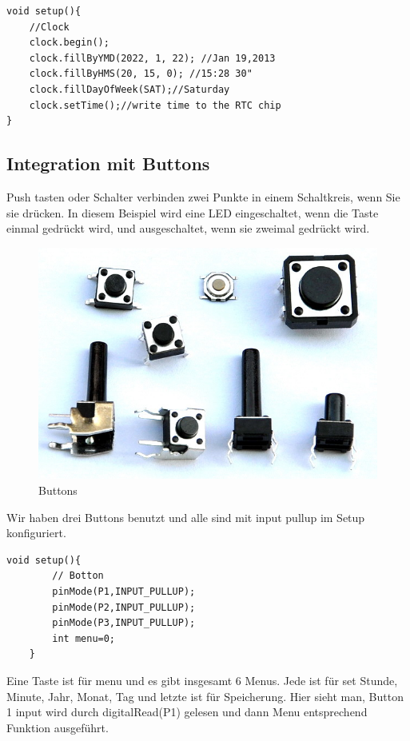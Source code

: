 \documentclass[conference]{IEEEtran}
\begin{document}
\begin{lstlisting}[style=CStyle]
void setup(){
	//Clock
	clock.begin();
	clock.fillByYMD(2022, 1, 22); //Jan 19,2013
	clock.fillByHMS(20, 15, 0); //15:28 30"
	clock.fillDayOfWeek(SAT);//Saturday
	clock.setTime();//write time to the RTC chip
}
\end{lstlisting}\textbf{}

\subsection{Integration mit Buttons}
Push tasten oder Schalter verbinden zwei Punkte in einem Schaltkreis, wenn Sie sie drücken. In diesem Beispiel wird eine LED eingeschaltet, wenn die Taste einmal gedrückt wird, und ausgeschaltet, wenn sie zweimal gedrückt wird.

\begin{figure}
	\begin{center}
		\includegraphics[scale=0.25]{btn}
	\end{center}
	\caption{Buttons}
\end{figure}

Wir haben drei Buttons benutzt und alle sind mit input pullup im Setup konfiguriert. 

\begin{lstlisting}[style=CStyle]
	void setup(){
		// Botton
		pinMode(P1,INPUT_PULLUP);
		pinMode(P2,INPUT_PULLUP);
		pinMode(P3,INPUT_PULLUP);
		int menu=0;
	}
\end{lstlisting}\textbf{}

Eine Taste ist für menu und es gibt insgesamt 6 Menus. Jede ist für set Stunde, Minute, Jahr, Monat,  Tag und letzte ist für Speicherung.  Hier sieht man, Button 1 input wird durch digitalRead(P1) gelesen und dann Menu entsprechend Funktion ausgeführt. 
\end{document}
